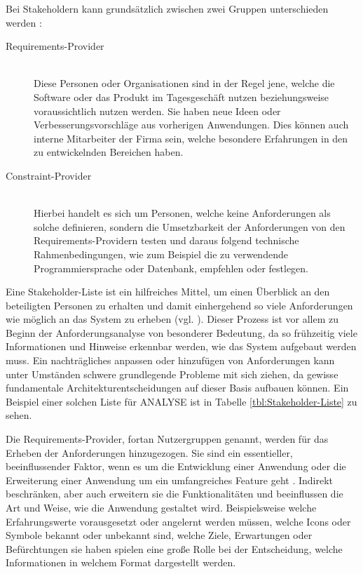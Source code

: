 Bei Stakeholdern kann grundsätzlich zwischen zwei Gruppen unterschieden werden \cite{Leffingwell.2011}:
\begin{description}
\item [Requirements-Provider] \hfill \\
Diese Personen oder Organisationen sind in der Regel jene, welche die Software oder das Produkt im Tagesgeschäft nutzen beziehungsweise voraussichtlich nutzen werden.
Sie haben neue Ideen oder Verbesserungsvorschläge aus vorherigen Anwendungen.
Dies können auch interne Mitarbeiter der Firma sein, welche besondere Erfahrungen in den zu entwickelnden Bereichen haben. %
\item [Constraint-Provider] \hfill \\
Hierbei handelt es sich um Personen, welche keine Anforderungen als solche definieren, sondern die Umsetzbarkeit der Anforderungen von den Requirements-Providern testen und daraus folgend technische Rahmenbedingungen, wie zum Beispiel die zu verwendende  Programmiersprache oder Datenbank, empfehlen oder festlegen.
\end{description}

Eine \glqq Stakeholder-Liste\grqq{} ist ein hilfreiches Mittel, um einen Überblick an den beteiligten Personen zu erhalten und damit einhergehend so viele Anforderungen wie möglich an das System zu erheben (vgl. \cite[S. 83]{Bergsmann.2018}).
Dieser Prozess ist vor allem zu Beginn der Anforderungsanalyse von besonderer Bedeutung, da so frühzeitig viele Informationen und Hinweise erkennbar werden, wie das System aufgebaut werden muss.
Ein nachträgliches anpassen oder hinzufügen von Anforderungen kann unter Umständen schwere grundlegende Probleme mit sich ziehen, da gewisse fundamentale Architekturentscheidungen auf dieser Basis aufbauen können.
Ein Beispiel einer solchen Liste für \gls{ANALYSE} ist in Tabelle \ref{tbl:Stakeholder-Liste} zu sehen.

Die Requirements-Provider, fortan Nutzergruppen genannt, werden für das Erheben der Anforderungen hinzugezogen.
Sie sind ein essentieller, beeinflussender Faktor, wenn es um die Entwicklung einer Anwendung oder die Erweiterung einer Anwendung um ein umfangreiches Feature geht \cite[S. 125]{Herczeg.2018}.
Indirekt beschränken, aber auch erweitern sie die Funktionalitäten und beeinflussen die Art und Weise, wie die Anwendung gestaltet wird. 
Beispielsweise welche Erfahrungswerte vorausgesetzt oder angelernt werden müssen, welche Icons oder Symbole bekannt oder unbekannt sind, welche Ziele, Erwartungen oder Befürchtungen sie haben spielen eine große Rolle bei der Entscheidung, welche Informationen in welchem Format dargestellt werden.

